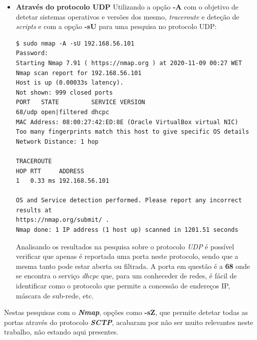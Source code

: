 \documentclass[10pt,english]{article}
\begin{document}
\begin{itemize}
    \item {\textbf{Através do protocolo UDP}}
    \newline
    Utilizando a opção \textbf{-A} com o objetivo de detetar sistemas operativos e versões dos mesmo, \textit{traceroute} e deteção de \textit{scripts} e com a opção \textbf{-sU} para uma pesquisa no protocolo UDP:
    
    \begin{lstlisting}
$ sudo nmap -A -sU 192.168.56.101                                             
Password:
Starting Nmap 7.91 ( https://nmap.org ) at 2020-11-09 00:27 WET
Nmap scan report for 192.168.56.101
Host is up (0.00033s latency).
Not shown: 999 closed ports
PORT   STATE         SERVICE VERSION
68/udp open|filtered dhcpc
MAC Address: 08:00:27:42:ED:8E (Oracle VirtualBox virtual NIC)
Too many fingerprints match this host to give specific OS details
Network Distance: 1 hop

TRACEROUTE
HOP RTT     ADDRESS
1   0.33 ms 192.168.56.101

OS and Service detection performed. Please report any incorrect results at 
https://nmap.org/submit/ .
Nmap done: 1 IP address (1 host up) scanned in 1201.51 seconds

    \end{lstlisting}
    
    \par Analisando os resultados na pesquisa sobre o protocolo \textit{UDP} é possível verificar que apenas é reportada uma porta neste protocolo, sendo que a mesma tanto pode estar aberta ou filtrada. A porta em questão é a \textbf{68} onde se encontra o serviço \textit{dhcpc} que, para um conheceder de redes, é fácil de identificar como o protocolo que permite a concessão de endereços IP, máscara de sub-rede, etc.


\end{itemize}




\par Nestas pesquisas com o \textbf{\textit{Nmap}}, opções como \textbf{-sZ}, que permite detetar todas as portas através do protocolo \textbf{\textit{SCTP}}, acabaram por não ser muito relevantes neste trabalho, não estando aqui presentes.


 
 
\end{document}
